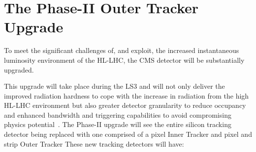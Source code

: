 \section{The Phase-II Outer Tracker Upgrade}\label{sec:tk-upgrade}
To meet the significant challenges of, and exploit, the increased instantaneous luminosity environment of the HL-LHC, the CMS detector will be substantially upgraded.

This upgrade will take place during the LS3 and will not only deliver the improved radiation hardness to cope with the increase in radiation from the high \PU HL-LHC environment but also greater detector granularity to reduce occupancy and enhanced bandwidth and triggering capabilities to avoid compromising physics potential~\cite{CMSCollaboration:2015zni,P2TrackerTDR}.
The Phase-II upgrade will see the entire silicon tracking detector being replaced with one comprised of a pixel Inner Tracker and pixel and strip Outer Tracker
These new tracking detectors will have:

